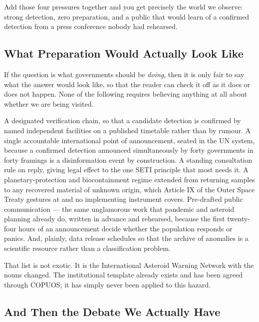 Add those four pressures together and you get precisely the world we observe: strong detection,
zero preparation, and a public that would learn of a confirmed detection from a press conference
nobody had rehearsed.

\subsection{What Preparation Would Actually Look Like}

If the question is what governments should be \emph{doing}, then it is only fair to say what the
answer would look like, so that the reader can check it off as it does or does not happen. None of
the following requires believing anything at all about whether we are being visited.

A designated verification chain, so that a candidate detection is confirmed by named independent
facilities on a published timetable rather than by rumour. A single accountable international point
of announcement, seated in the UN system, because a confirmed detection announced simultaneously by
forty governments in forty framings is a disinformation event by construction. A standing
consultation rule on reply, giving legal effect to the one SETI principle that most needs it. A
planetary-protection and biocontainment regime extended from returning samples to any recovered
material of unknown origin, which Article IX of the Outer Space Treaty gestures at and no
implementing instrument covers. Pre-drafted public communication --- the same unglamorous work that
pandemic and asteroid planning already do, written in advance and rehearsed, because the first
twenty-four hours of an announcement decide whether the population responds or panics. And, plainly,
data release schedules so that the archive of anomalies is a scientific resource rather than a
classification problem.

That list is not exotic. It is the International Asteroid Warning Network with the nouns changed.
The institutional template already exists and has been agreed through COPUOS; it has simply never
been applied to this hazard. 

\subsection{And Then the Debate We Actually Have}

